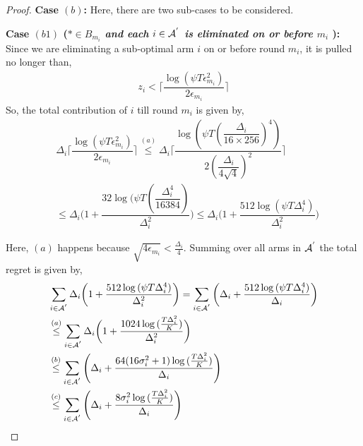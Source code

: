 \begin{proof}
\textbf{Case $(b)$:} Here, there are two sub-cases to be considered.

\noindent
\textbf{Case $(b1)$ (\textit{${*}\in B_{m_{i}}$ and each ${i}\in \mathcal{A}^{'}$ is  eliminated on or before $m_{i}$ }): } Since we are eliminating a sub-optimal arm ${i}$ on or before round $m_{i}$, it is pulled no longer than, 
 \begin{align*}
 z_{i} < \bigg\lceil\dfrac{\log{(\psi T\epsilon_{m_{i}}^{2})}}{2\epsilon_{m_{i}}}\bigg\rceil
 \end{align*}
So, the total contribution of ${i}$  till round $m_{i}$ is given by, 
\begin{align*}
&\Delta_{i}\bigg\lceil\dfrac{\log{(\psi T\epsilon_{m_{i}}^{2})}}{2\epsilon_{m_{i}}}\bigg\rceil
\overset{(a)}{\leq}    \Delta_{i}\bigg\lceil\dfrac{\log{(\psi T(\dfrac{\Delta_{i}}{16 \times 256})^{4})}}{2(\dfrac{\Delta_{i}}{4\sqrt{4}})^{2}}\bigg\rceil \\
&\leq   \Delta_{i}\bigg(1+\dfrac{32\log{(\psi T(\dfrac{\Delta_{i}^{4}}{16384})}}{\Delta_{i}^{2}}\bigg)
\leq \Delta_{i}\bigg(1+\dfrac{512\log{(\psi T\Delta_{i}^{4})}}{\Delta_{i}^{2}}\bigg) 
\end{align*} 

Here, $(a)$ happens because $\sqrt{4\epsilon_{m_{i}}} < \frac{\Delta_{i}}{4}$. Summing over all arms in $\mathcal{A}^{'}$ the total regret is given by, 
\begin{align*}
&\sum_{i\in \A^{'}}\Delta_{i}\bigg(1+\dfrac{512\log{(\psi T\Delta_{i}^{4}})}{\Delta_{i}^{2}}\bigg) = \sum_{i\in \A^{'}}\bigg(\Delta_{i} +\dfrac{512\log{(\psi T\Delta_{i}^{4}})}{\Delta_{i}}\bigg) \\
&\overset{(a)}{\leq} \sum_{i\in \A^{'}} \Delta_{i}\bigg(1+\dfrac{1024\log{( \frac{T\Delta_{i}^{2}}{K})}}{\Delta_{i}^{2}}\bigg)\\
&\overset{(b)}{\leq} \sum_{i\in \A^{'}} \left(\Delta_{i} +\dfrac{64(16\sigma_i^2 + 1)\log{( \frac{T\Delta_{i}^{2}}{K})}}{\Delta_{i}}\right)\\
&%
\overset{(c)}{\leq} \sum_{i\in \A^{'}} \left(\Delta_{i} +\dfrac{8\sigma_i^2\log{( \frac{T\Delta_{i}^{2}}{K})}}{\Delta_{i}}\right)\\
\end{align*}


\end{proof}
